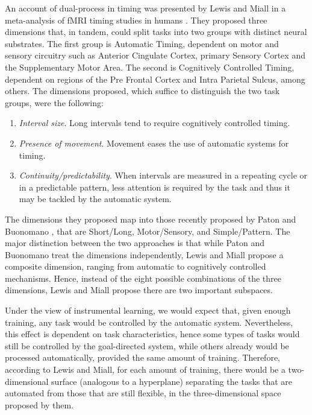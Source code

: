         An account of dual-process in timing was presented by Lewis and Miall in a meta-analysis of fMRI timing studies in humans \cite{lewis2003distinct}. They proposed three dimensions that, in tandem, could split tasks into two groups with distinct neural substrates. The first group is Automatic Timing, dependent on motor and sensory circuitry such as Anterior Cingulate Cortex, primary Sensory Cortex and the Supplementary Motor Area. The second is Cognitively Controlled Timing, dependent on regions of the Pre Frontal Cortex and Intra Parietal Sulcus, among others. The dimensions proposed, which suffice to distinguish the two task groups, were the following:
        
        \begin{enumerate}
            \item \textit{Interval size}. Long intervals tend to require cognitively controlled timing.
            \item \textit{Presence of movement}. Movement eases the use of automatic systems for timing.
            \item \textit{Continuity/predictability}. When intervals are measured in a repeating cycle or in a predictable pattern, less attention is required by the task and thus it may be tackled by the automatic system.
        \end{enumerate}
        
        The dimensions they proposed map into those recently proposed by Paton and Buonomano \cite{paton2018neural}, that are Short/Long, Motor/Sensory, and Simple/Pattern. The major distinction between the two approaches is that while Paton and Buonomano treat the dimensions independently, Lewis and Miall propose a composite dimension, ranging from automatic to cognitively controlled mechanisms. Hence, instead of the eight possible combinations of the three dimensions, Lewis and Miall propose there are two important subspaces.
        
        Under the view of instrumental learning, we would expect that, given enough training, any task would be controlled by the automatic system. Nevertheless, this effect is dependent on task characteristics, hence some types of tasks would still be controlled by the goal-directed system, while others already would be processed automatically, provided the same amount of training. Therefore, according to Lewis and Miall, for each amount of training, there would be a two-dimensional surface (analogous to a hyperplane) separating the tasks that are automated from those that are still flexible, in the three-dimensional space proposed by them.
        
